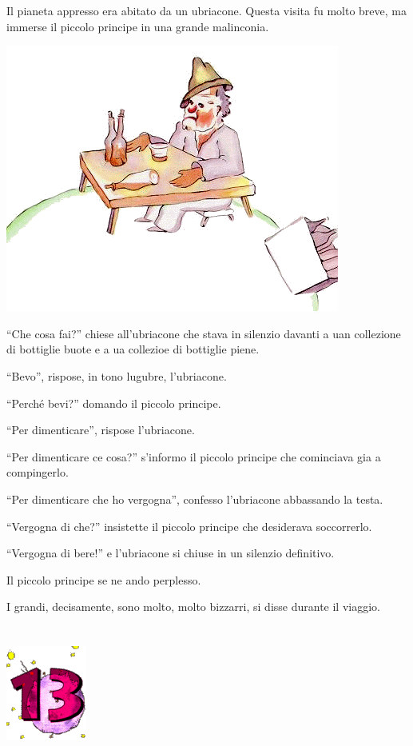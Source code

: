 \documentclass[11pt]{scrbook}
\begin{document}
Il pianeta appresso era abitato da un ubriacone. Questa visita fu molto
breve, ma immerse il piccolo principe in una grande malinconia.

\begin{center}
\includegraphics{img/12a}
\end{center}

``Che cosa fai?'' chiese all'ubriacone che stava in silenzio davanti a
uan collezione di bottiglie buote e a ua collezioe di bottiglie piene.

``Bevo'', rispose, in tono lugubre, l'ubriacone.

``Perché bevi?'' domando il piccolo principe.

``Per dimenticare'', rispose l'ubriacone.

``Per dimenticare ce cosa?'' s'informo il piccolo principe che
cominciava gia a compingerlo.

``Per dimenticare che ho vergogna'', confesso l'ubriacone abbassando la
testa.

``Vergogna di che?'' insistette il piccolo principe che desiderava
soccorrerlo.

``Vergogna di bere!'' e l'ubriacone si chiuse in un silenzio definitivo.

Il piccolo principe se ne ando perplesso.

I grandi, decisamente, sono molto, molto bizzarri, si disse durante il
viaggio.

\chapter{}
\begin{center}
\includegraphics{img/chapter13}
\end{center}
\end{document}
